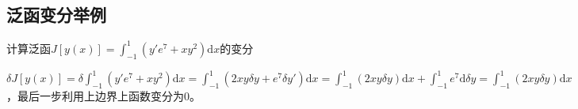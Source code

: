 \documentclass{article}
\begin{document}

\subsection{泛函变分举例}
计算泛函$J[y(x)]=\int_{-1}^{1} (y'e^7 +xy^2)\mathrm{d}x$的变分


$\delta J[y(x)]=\delta\int_{-1}^{1}(y'e^7+xy^2)\mathrm{d}x=\int_{-1}^{1}(2xy\delta y+e^7\delta y')\mathrm{d}x=\int_{-1}^{1}(2xy\delta y)\mathrm{d}x+\int_{-1}^{1}e^7\mathrm{d}\delta y=\int_{-1}^{1}(2xy\delta y)\mathrm{d}x
$，最后一步利用上边界上函数变分为0。







\end{document}
